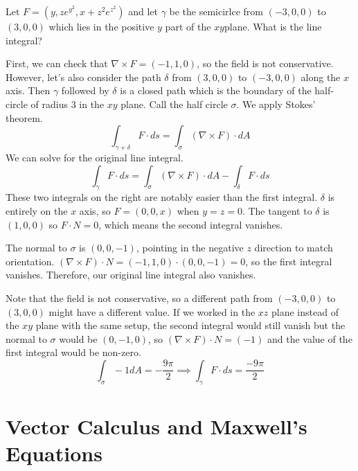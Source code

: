 \documentclass[fleqn,letterpaper]{report}
\begin{document}
\begin{example}
Let $F = (y, z e^{y^2}, x + z^2
e^{z^2})$ and let $\gamma$ be the semicirlce from $(-3,0,0)$ to
$(3,0,0)$ which lies in the positive $y$ part of the
$xy$plane. What is the line integral?

First, we can check that $\nabla \times F = (-1,1,0)$, so the
field is not conservative. However, let's also consider the
path $\delta$ from $(3,0,0)$ to $(-3,0,0)$ along the $x$ axis.
Then $\gamma$ followed by $\delta$ is a closed path which is the boundary
of the half-circle of radius $3$ in the $xy$ plane. Call the
half circle $\sigma$. We apply Stokes' theorem.
\begin{equation*}
\int_{\gamma + \delta} F \cdot ds = \int_\sigma (\nabla
\times F) \cdot dA 
\end{equation*}
We can solve for the original line integral.
\begin{equation*}
\int_\gamma F \cdot ds = \int_\sigma (\nabla \times F) \cdot
dA - \int_\delta F \cdot ds 
\end{equation*}
These two integrals on the right are notably easier than the
first integral. $\delta$ is entirely on the $x$ axis, so $F =
(0,0,x)$ when $y
= z = 0$. The tangent to $\delta$ is $(1,0,0)$ so $F \cdot N
= 0$, which means the second integral vanishes.

The normal to $\sigma$ is $(0,0,-1)$, pointing in the negative
$z$ direction to match orientation. $(\nabla \times F)
\cdot N = (-1,1,0) \cdot (0,0,-1) = 0$, so the first integral
vanishes. Therefore, our original line integral also
vanishes.

Note that the field is not conservative, so a different path
from $(-3,0,0)$ to $(3,0,0)$ might have a different value. If
we worked in the $xz$ plane instead of the $xy$ plane with the
same setup, the second integral would still vanish but the
normal to $\sigma$ would be $(0,-1,0)$, so $(\nabla \times F)
\cdot N = (-1)$ and the value of the first integral would be
non-zero.
\begin{equation*}
\int_\sigma -1 dA = - \frac{9\pi}{2} \implies \int_\gamma F
\cdot ds = \frac{-9\pi}{2}
\end{equation*}
\end{example}

\section{Vector Calculus and Maxwell's Equations}
\label{maxwells-equations}
\end{document}
